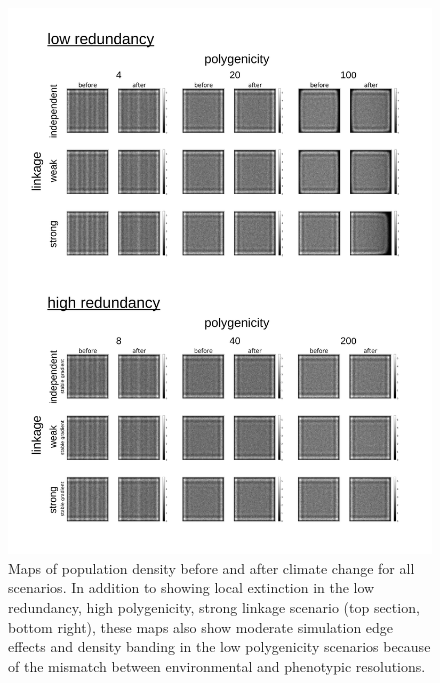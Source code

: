 \documentclass[9pt,twoside,lineno]{new_article}
\begin{document}
\begin{figure}
\centering
\includegraphics[width=.8\linewidth]{pub/figs_and_stats/FIG_S3_density_shift_ROWLABELS_CORRECTED.png}
\caption{Maps of population density before and after climate change for all scenarios. In addition to showing local extinction in the low redundancy, high polygenicity, strong linkage scenario (top section, bottom right), these maps also show moderate simulation edge effects and density banding in the low polygenicity scenarios because of the mismatch between environmental and phenotypic resolutions.}
\label{fig:fig_s3}
\end{figure}
\end{document}
